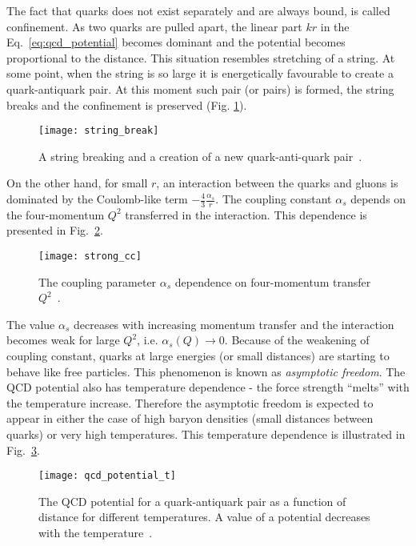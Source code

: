       The fact that quarks does not exist separately and are always bound, is called confinement.
      As two quarks are pulled apart, the linear part $kr$ in the Eq.~\ref{eq:qcd_potential} becomes dominant and the potential becomes proportional to the distance.
      This situation resembles stretching of a string.
      At some point, when the string is so large it is energetically favourable to create a quark-antiquark pair.
      At this moment such pair (or pairs) is formed, the string breaks and the confinement is preserved (Fig. \ref{fig:string_break}).
      \begin{figure}[h]
        \centering
        \texttt{[image: string\_break]}
        \caption{A string breaking and a creation of a new quark-anti-quark pair~\cite{dfck}.}
        \label{fig:string_break}
      \end{figure}
      
      On the other hand, for small $r$, an interaction between the quarks and gluons is dominated by the Coulomb-like term $-\frac{4}{3} \frac{\alpha_s}{r}$.
      The coupling constant $\alpha_s$ depends on the four-momentum $Q^2$ transferred in the interaction.
      This dependence is presented in Fig.~\ref{fig:strong_cc}.
      \begin{figure}[h]
        \centering
        \texttt{[image: strong\_cc]}
        \caption{The coupling parameter $\alpha_s$ dependence on four-momentum transfer~$Q^2$~\cite{pdg}.}
        \label{fig:strong_cc}
      \end{figure}
      The value $\alpha_s$ decreases with increasing momentum transfer and the interaction becomes weak for large $Q^2$, i.e. $\alpha_s (Q) \to 0$.
      Because of the weakening of coupling constant, quarks at large energies (or small distances) are starting to behave like free particles.
      This phenomenon is known as \textit{asymptotic freedom}.      
      The QCD potential also has temperature dependence - the force strength ``melts'' with the temperature increase.
      Therefore the asymptotic freedom is expected to appear in either the case of high baryon densities (small distances between quarks) or very high temperatures.
      This temperature dependence is illustrated in Fig.~\ref{fig:qcd_potential}.
      \begin{figure}[h]
        \centering
        \texttt{[image: qcd\_potential\_t]}
        \caption{The QCD potential for a quark-antiquark pair as a function of distance for different temperatures. A value of a potential decreases with the temperature~\cite{dfck}.}
        \label{fig:qcd_potential}
      \end{figure}
      
